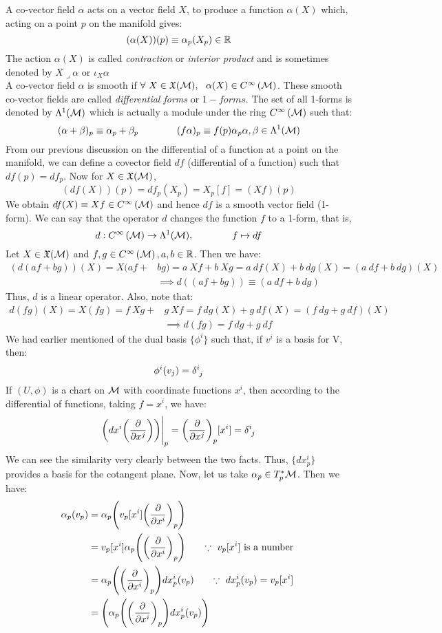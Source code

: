 A co-vector field $\alpha$ acts on a vector field $X$, to produce a function $\alpha(X)$ which, acting on a point $p$ on the manifold gives:
$$(\alpha(X))(p)  \equiv \alpha_p(X_p) \in \mathbb{R}$$
The action $\alpha(X)$ is called \textit{contraction} or \textit{interior product} and is sometimes denoted by $X{\lrcorner \alpha}$ or $\iota_X \alpha$\\[0.2cm]
A co-vector field $\alpha$ is smooth if $\forall \ X \in \mathfrak{X}(\mathcal M),\ \ \alpha(X) \in C^{\infty}\left(\mathcal M\right)$. These smooth co-vector fields are called \textit{differential forms} or $1-forms$. The set of all 1-forms is denoted by $\Lambda^1(\mathcal M)$ which is actually a module under the ring $C^{\infty}\left(\mathcal M\right)$ such that:
$$(\alpha + \beta)_p\equiv \alpha_p+\beta_p \qquad\qquad (f\alpha)_p \equiv f(p)\alpha_p \alpha,\beta \in \Lambda^1(\mathcal M)$$
From our previous discussion on the differential of a function at a point on the manifold, we can define a covector field $df$ (differential of a function) such that $df(p) = df_p$. Now for $X\in \mathfrak{X}(\mathcal M)$,
$$(df(X))(p) = df_p(X_p) = X_p[f] = (Xf)(p)$$
We obtain $df(X)\equiv Xf \in C^{\infty}\left(\mathcal M\right)$ and hence $df$ is a smooth vector field (1-form). We can say that the operator $d$ changes the function $f$ to a 1-form, that is,
$$d:C^{\infty}\left(\mathcal M\right)\rightarrow \Lambda^1(\mathcal M), \qquad\qquad f\mapsto df$$
Let $X\in\mathfrak{X}(\mathcal M)$ and $f,g\in C^{\infty}\left(\mathcal M\right), a,b\in \mathbb{R}$. Then we have:
\begin{align*}
    (d(af+bg))(X) = X(af+&bg) = a\ Xf+b\ Xg = a\ df(X) + b\ dg(X) = (a\ df + b \ dg)(X)\\
&\implies d((af+bg))\equiv (a\ df + b \ dg)
\end{align*}
Thus, $d$ is a linear operator. Also, note that:
\begin{align*}
    d(fg)(X) = X(fg) = f\ Xg + &g \ Xf = f\ dg(X)+g\ df(X) = (f\ dg + g \ df)(X)\\
    &\implies d(fg) = f\ dg+g \  df
\end{align*}
We had earlier mentioned of the dual basis $\{\phi^i\}$ such that, if ${v^i}$ is a basis for V, then:
$$\phi^i(v_j) = \tensor{\delta}{^i_j}$$
If $(U,\phi)$ is a chart on $\mathcal M$ with coordinate functions $x^i$, then according to the differential of functions, taking $f=x^i$, we have:
$$\qty(dx^i\qty(\pdv{x^j}))\Bigg|_p =\qty(\pdv{x^j})_p[x^i] = \tensor{\delta}{^i_j}$$
We can see the similarity very clearly between the two facts. Thus, $\{dx^i_p\}$ provides a basis for the cotangent plane. Now, let us take $\alpha_p\in T_p^*\mathcal M$. Then we have:
\begin{align*}
    \alpha_p (v_p) &= \alpha_p\qty(v_p[x^i]\qty(\pdv{x^i})_p) \\
    &=v_p[x^i] \alpha_p\qty(\qty(\pdv{x^i})_p)\qquad\text{$\because \ v_p[x^i]$ is a number }\\
    &=\alpha_p\qty(\qty(\pdv{x^i})_p) dx^i_p(v_p) \qquad \text{$\because \ dx^i_p(v_p) = v_p[x^i]$  }\\
    &=\qty(\alpha_p\qty(\qty(\pdv{x^i})_p) dx^i_p(v_p) )
\end{align*}
